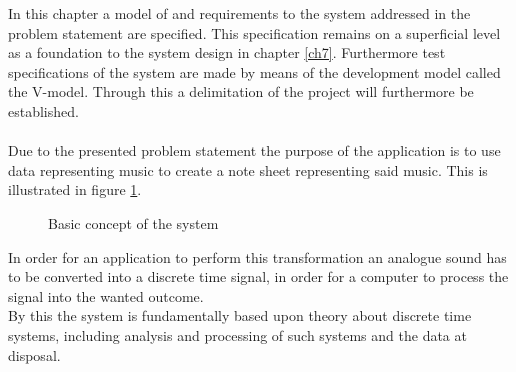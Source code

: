 In this chapter a model of and requirements to the system addressed in the problem statement are specified. This specification remains on a superficial level as a foundation to the system design in chapter \ref{ch7}. Furthermore test specifications of the system are made by means of the development model called the V-model. Through this a delimitation of the project will furthermore be established. \\   
\\
Due to the presented problem statement the purpose of the application is to use data representing music to create a note sheet representing said music. This is illustrated in figure \ref{fig:model1}.    
\begin{figure}[h]
\centering
{}
\caption{Basic concept of the system}
\label{fig:model1}
\end{figure}
In order for an application to perform this transformation an analogue sound has to be converted into a discrete time signal, in order for a computer to process the signal into the wanted outcome. \\
By this the system is fundamentally based upon theory about discrete time systems, including analysis and processing of such systems and the data at disposal.

